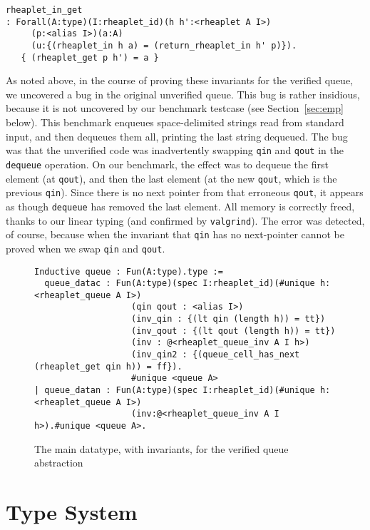 \documentclass[9pt,natbib]{sigplanconf}
\begin{document}
{\small
\begin{verbatim}
rheaplet_in_get
: Forall(A:type)(I:rheaplet_id)(h h':<rheaplet A I>)
     (p:<alias I>)(a:A)
     (u:{(rheaplet_in h a) = (return_rheaplet_in h' p)}).
   { (rheaplet_get p h') = a }
\end{verbatim}
}
  
As noted above, in the course of proving these invariants for the
verified queue, we uncovered a bug in the original unverified queue.
This bug is rather insidious, because it is not uncovered by our
benchmark testcase (see Section~\ref{sec:emp} below).  This benchmark
enqueues space-delimited strings read from standard input, and then
dequeues them all, printing the last string dequeued.  The bug was
that the unverified code was inadvertently swapping \texttt{qin} and
\texttt{qout} in the \texttt{dequeue} operation.  On our benchmark,
the effect was to dequeue the first element (at \texttt{qout}), and
then the last element (at the new \texttt{qout}, which is the previous
\texttt{qin}).  Since there is no next pointer from that erroneous
\texttt{qout}, it appears as though \texttt{dequeue} has removed the
last element.  All memory is correctly freed, thanks to our linear
typing (and confirmed by \texttt{valgrind}).  The error was detected,
of course, because when the invariant that \texttt{qin} has no
next-pointer cannot be proved when we swap \texttt{qin} and
\texttt{qout}.

\begin{figure*}
\begin{verbatim}
Inductive queue : Fun(A:type).type :=
  queue_datac : Fun(A:type)(spec I:rheaplet_id)(#unique h:<rheaplet_queue A I>)
                   (qin qout : <alias I>)
                   (inv_qin : {(lt qin (length h)) = tt})
                   (inv_qout : {(lt qout (length h)) = tt})
                   (inv : @<rheaplet_queue_inv A I h>)
                   (inv_qin2 : {(queue_cell_has_next (rheaplet_get qin h)) = ff}).
                   #unique <queue A>
| queue_datan : Fun(A:type)(spec I:rheaplet_id)(#unique h:<rheaplet_queue A I>)
                   (inv:@<rheaplet_queue_inv A I h>).#unique <queue A>.
\end{verbatim}
\label{fig:queue2}
\caption{The main datatype, with invariants, for the verified queue abstraction}
\end{figure*}

\section{Type System}
\end{document}
